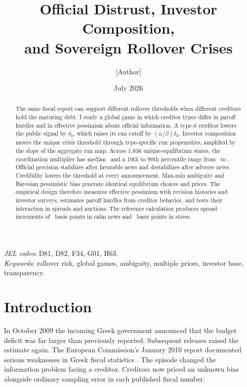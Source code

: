 \documentclass[11pt]{article}
\title{Official Distrust, Investor Composition,\\ and Sovereign Rollover Crises}
\author{[Author]}
\date{July 2026}
\theoremstyle{definition}
\begin{document}
\maketitle

\begin{abstract}
\noindent The same fiscal report can support different rollover thresholds when different creditors hold the maturing debt. I study a global game in which creditor types differ in payoff hurdles and in effective pessimism about official information. A type-$k$ creditor lowers the public signal by $\delta_k$, which raises its run cutoff by $(\alpha/\beta)\delta_k$. Investor composition moves the unique crisis threshold through type-specific run propensities, amplified by the slope of the aggregate run map. Across 1,836 unique-equilibrium states, the coordination multiplier has median \MultMedian\ and a 10th to 90th percentile range from \MultPten\ to \MultPninety. Official precision stabilizes after favorable news and destabilizes after adverse news. Credibility lowers the threshold at every announcement. Max-min ambiguity and Bayesian pessimistic bias generate identical equilibrium choices and prices. The empirical design therefore measures effective pessimism with revision histories and investor surveys, estimates payoff hurdles from creditor behavior, and tests their interaction in spreads and auctions. The reference calculation produces spread increments of \PremCalm\ basis points in calm news and \PremStress\ basis points in stress.
\end{abstract}

\medskip
\noindent\textit{JEL codes}: D81, D82, F34, G01, H63.\\
\noindent\textit{Keywords}: rollover risk, global games, ambiguity, multiple priors, investor base, transparency.

\section{Introduction}\label{sec:intro}

In October 2009 the incoming Greek government announced that the budget deficit was far larger than previously reported. Subsequent releases raised the estimate again. The European Commission's January 2010 report documented serious weaknesses in Greek fiscal statistics \citep{EC2010Greece}. The episode changed the information problem facing a creditor. Creditors now priced an unknown bias alongside ordinary sampling error in each published fiscal number.
\end{document}
